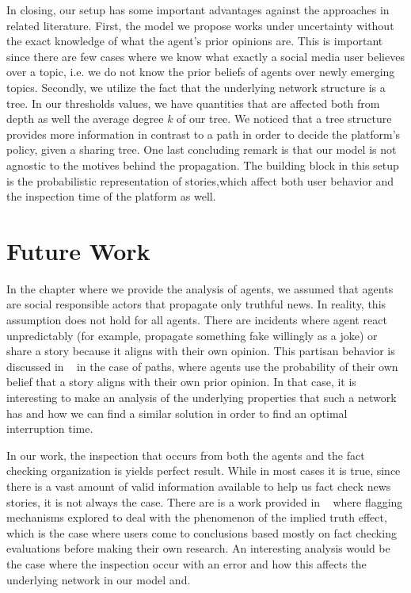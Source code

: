 In closing, our setup has some important advantages against the approaches in related literature. First, the model we propose works under uncertainty without the exact knowledge of what the agent's prior opinions are. This is important since there are few cases where we know what exactly a social media user believes over a topic, i.e. we do not know the prior beliefs of agents over newly emerging topics. Secondly, we utilize the fact that the underlying network structure is a tree. In our thresholds values, we have quantities that are affected both from depth as well the average degree $k$ of our tree.  We noticed that a tree structure provides more information in contrast to a path in order to decide the platform's policy, given a sharing tree. One last concluding remark is that our model is not agnostic to the motives behind the propagation. The building block in this setup is the probabilistic representation of stories,which affect both user behavior and the inspection time of the platform as well.

\section{Future Work}
\label{sec:FW}

In the chapter where we provide the analysis of agents, we assumed that agents are social responsible actors that propagate only truthful news. In reality, this assumption does not hold for all agents. There are incidents where agent react unpredictably (for example, propagate something fake willingly as a joke) or share a story because it aligns with their own opinion. This partisan behavior is discussed in ~\cite{papanastasiou} in the case of paths, where agents use the probability of their own belief that a story aligns with their own prior opinion. In that case, it is interesting to make an analysis of the underlying properties that such a network has and how we can find a similar solution in order to find an optimal interruption time.

In our work, the inspection that occurs from both the agents and the fact checking organization is yields perfect result. While in most cases it is true, since there is a vast amount of valid information available to help us fact check news stories, it is not always the case. There are is a work provided in ~\cite{ImpliedTEpennycock} where flagging mechanisms explored to deal with the phenomenon of the implied truth effect, which is the case where users come to conclusions based mostly on fact checking evaluations before making their own research. An interesting analysis would be the case where the inspection occur with an error and how this affects the underlying network in our model and.

